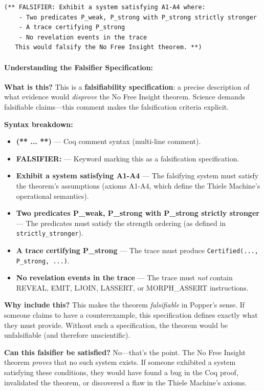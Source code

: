 \begin{lstlisting}
(** FALSIFIER: Exhibit a system satisfying A1-A4 where:
    - Two predicates P_weak, P_strong with P_strong strictly stronger
    - A trace certifying P_strong
    - No revelation events in the trace
   This would falsify the No Free Insight theorem. **)
\end{lstlisting}

\paragraph{Understanding the Falsifier Specification:}

\textbf{What is this?} This is a \textbf{falsifiability specification}: a precise description of what evidence would \textit{disprove} the No Free Insight theorem. Science demands falsifiable claims---this comment makes the falsification criteria explicit.

\textbf{Syntax breakdown:}
\begin{itemize}
    \item \textbf{(** ... **)} — Coq comment syntax (multi-line comment).
    \item \textbf{FALSIFIER:} — Keyword marking this as a falsification specification.
    \item \textbf{Exhibit a system satisfying A1-A4} — The falsifying system must satisfy the theorem's assumptions (axioms A1-A4, which define the Thiele Machine's operational semantics).
    \item \textbf{Two predicates P\_weak, P\_strong with P\_strong strictly stronger} — The predicates must satisfy the strength ordering (as defined in \texttt{strictly\_stronger}).
    \item \textbf{A trace certifying P\_strong} — The trace must produce \texttt{Certified(..., P\_strong, ...)}.
    \item \textbf{No revelation events in the trace} — The trace must \textit{not} contain REVEAL, EMIT, LJOIN, LASSERT, or MORPH\_ASSERT instructions.
\end{itemize}

\textbf{Why include this?} This makes the theorem \textit{falsifiable} in Popper's sense. If someone claims to have a counterexample, this specification defines exactly what they must provide. Without such a specification, the theorem would be unfalsifiable (and therefore unscientific).

\textbf{Can this falsifier be satisfied?} No---that's the point. The No Free Insight theorem \textit{proves} that no such system exists. If someone exhibited a system satisfying these conditions, they would have found a bug in the Coq proof, invalidated the theorem, or discovered a flaw in the Thiele Machine's axioms.


